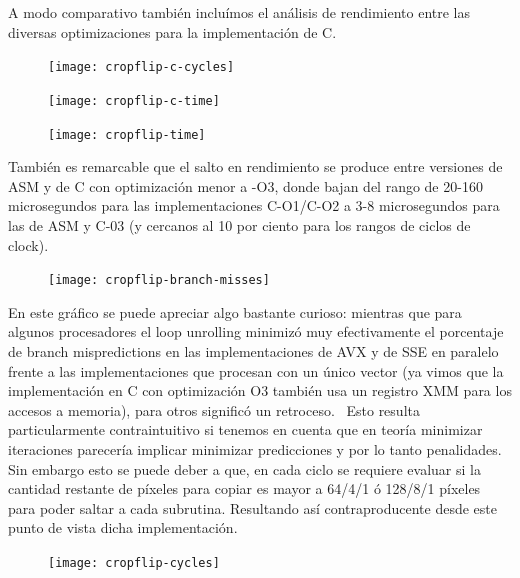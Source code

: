 A modo comparativo también incluímos el análisis de rendimiento entre las diversas optimizaciones para la implementación de C.

\begin{figure}[H]
\centering
\texttt{[image: cropflip-c-cycles]} 
\label{fig:cropflip-c-cycles}
\end{figure}

\begin{figure}[H]
\centering
\texttt{[image: cropflip-c-time]} 
\label{fig:cropflip-c-time}
\end{figure}

\begin{figure}[H]
\centering
\texttt{[image: cropflip-time]}
\label{fig:cropflip-time}
\end{figure}

También es remarcable que el salto en rendimiento se produce entre versiones de ASM y de C con optimización menor a -O3, donde bajan del rango de 20-160 microsegundos para las implementaciones C-O1/C-O2 a 3-8 microsegundos para las de ASM y C-03 (y cercanos al 10 por ciento para los rangos de ciclos de clock).

\begin{figure}[H]
\centering
\texttt{[image: cropflip-branch-misses]}
\label{fig:cropflip-branch-misses}
\end{figure}

En este gráfico se puede apreciar algo bastante curioso: mientras que para algunos procesadores el loop unrolling minimizó muy efectivamente el porcentaje de branch mispredictions en las implementaciones de AVX y de SSE en paralelo frente a las implementaciones que procesan con un único vector (ya vimos que la implementación en C con optimización O3 también usa un registro XMM para los accesos a memoria), para otros significó un retroceso.
\ Esto resulta particularmente contraintuitivo si tenemos en cuenta que en teoría minimizar iteraciones parecería implicar minimizar predicciones y por lo tanto penalidades. Sin embargo esto se puede deber a que, en cada ciclo se requiere evaluar si la cantidad restante de píxeles para copiar es mayor a  64/4/1 ó 128/8/1 píxeles para poder saltar a cada subrutina. Resultando así contraproducente desde este punto de vista dicha implementación.


\begin{figure}[H]
\centering
\texttt{[image: cropflip-cycles]}
\label{fig:cropflip-cycles}
\end{figure}




	
